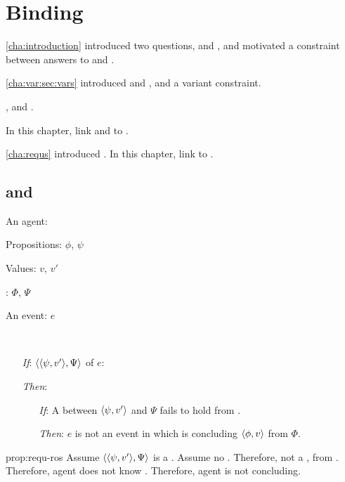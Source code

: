 \chapter{Binding}
\label{cha:binding}

\begin{note}
  \autoref{cha:introduction} introduced two questions, \qWhy{} and \qHow{}, and motivated a constraint between answers to \qWhy{} and \qHow{}.

  \autoref{cha:var:sec:vars} introduced \qWhyV{} and \qHowV{}, and a variant constraint.

  \fc{}, and \requ{}.

  In this chapter, link  and  to \qWhyV{}.
\end{note}

\begin{note}
  \autoref{cha:requs} introduced .
  In this chapter, link  to \qWhyV{}.
\end{note}


\section{ and }

\begin{note}
  \begin{proposition}
    \label{prop:requ-ros}
    \begin{itemize*}[noitemsep]
    \item
      An agent: \vAgent{}
    \item
      Propositions: \(\phi\), \(\psi\)
    \item
      Values: \(v\), \(v'\)
    \item
      : \(\Phi\), \(\Psi\)
    \item
      An event: \(e\)
    \item
      \mbox{ }
    \end{itemize*}

    \begin{itemize}
    \item[\emph{If}:]
      \(\langle \langle \psi, v' \rangle, \Psi \rangle\) \requ{} of \(e\):
    \item[\emph{Then}:]
      \begin{itemize}
      \item[\emph{If}:]
        A \ros{} between \(\langle \psi, v' \rangle\) and \(\Psi\) fails to hold from .
      \item[\emph{Then}:]
        \(e\) is not an event in which \vAgent{} is concluding \(\langle \phi, v \rangle\) from \(\Phi\).
      \end{itemize}
    \end{itemize}
    \vspace{-\baselineskip}
  \end{proposition}

  \begin{argument}{prop:requ-ros}
      Assume \(\langle \langle \psi, v' \rangle, \Psi \rangle\) is a \requ{}. Assume no \ros{}. Therefore, not a \fc{}, from \agpe{}. Therefore, agent does not know \fc{}. Therefore, agent is not concluding.
    \end{argument}
\end{note}

